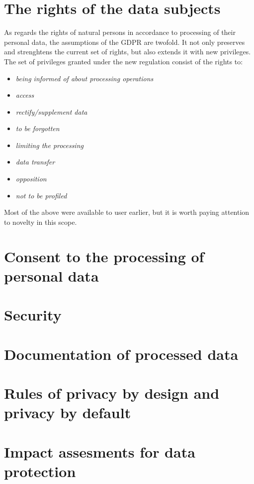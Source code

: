 \documentclass[en, noamssymb]{mgr}
\begin{document}
\section{The rights of the data subjects}

As regards the rights of natural persons in accordance to processing of their personal data, the assumptions of the GDPR are twofold. It not only preserves and strenghtens the current set of rights, but also extends it with new privileges.
The set of privileges granted under the new regulation consist of the rights to\cite{giodo}:

\begin{itemize}

\item \textit{being informed of about processing operations}
\item \textit{access}
\item \textit{rectify/supplement data}
\item \textit{to be forgotten}
\item \textit{limiting the processing}
\item \textit{data transfer}
\item \textit{opposition}
\item \textit{not to be profiled}

\end{itemize}

Most of the above were available to user earlier, but it is worth paying attention to novelty in this scope.


\section{Consent to the processing of personal data}
\section{Security}
\section{Documentation of processed data}
\section{Rules of privacy by design and privacy by default}
\section{Impact assesments for data protection}
\end{document}
